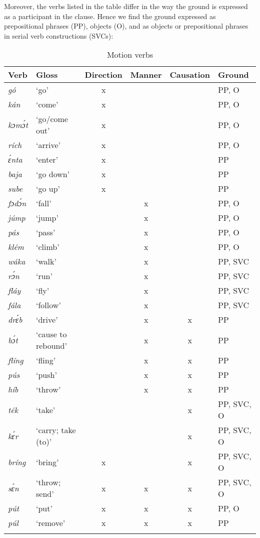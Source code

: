Moreover, the verbs listed in the table differ in the way the ground is expressed as a participant in the clause. Hence we find the ground expressed as prepositional phrases (PP), objects (O), and as objects or prepositional phrases in serial verb constructions (SVCs):


\begin{table}
\caption{Motion verbs}
\label{tab:key:8.5}

\begin{tabularx}{\textwidth}{lX ccc l}
\lsptoprule
Verb & Gloss & Direction & Manner & Causation & Ground\\
\midrule 
\itshape gó & ‘go’ & x &  &  & PP, O\\
\itshape kán & ‘come’ & x &  &  & PP, O\\
\itshape kɔmɔ́t & ‘go/come out’ & x &  &  & PP, O\\
\itshape rích & ‘arrive’ & x &  &  & PP, O\\
\itshape ɛ́nta & ‘enter’ & x &  &  & PP\\
\itshape baja & ‘go down’ & x &  &  & PP\\
\itshape sube & ‘go up’ & x &  &  & PP\\
\itshape fɔdɔ́n & ‘fall’ &  & x &  & PP, O\\
\itshape júmp & ‘jump’ &  & x &  & PP, O\\
\itshape pás & ‘pass’ &  & x &  & PP, O\\
\itshape klém & ‘climb’ &  & x &  & PP, O\\
\itshape wáka & ‘walk’ &  & x &  & PP, SVC\\
\itshape rɔ́n & ‘run’ &  & x &  & PP, SVC\\
\itshape fláy & ‘fly’ &  & x &  & PP, SVC\\
\itshape fála & ‘follow’ &  & x &  & PP, SVC\\
\itshape drɛ́b & ‘drive’ &  & x & x & PP\\
\itshape bɔ́t & ‘cause to rebound’ &  & x & x & PP\\
\itshape flíng & ‘fling’ &  & x & x & PP\\
\itshape pús & ‘push’ &  & x & x & PP\\
\itshape híb & ‘throw’ &  & x & x & PP\\
\itshape ték & ‘take’ &  &  & x & PP, SVC, O\\
\itshape kɛ́r & ‘carry; take (to)’ &  &  & x & PP, SVC, O\\
\itshape bríng & ‘bring’ & x &  & x & PP, SVC, O\\
\itshape sɛ́n & ‘throw; send’ & x & x & x & PP, SVC, O\\
\itshape pút & ‘put’ & x & x & x & PP, O\\
\itshape púl & ‘remove’ & x & x & x & PP\\
\lspbottomrule
\end{tabularx}
\end{table}

